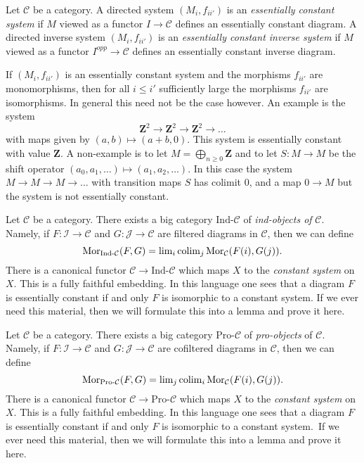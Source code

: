 \begin{definition}
\label{definition-essentially-constant-system}
Let $\mathcal{C}$ be a category. A directed system
$(M_i, f_{ii'})$ is an {\it essentially constant system}
if $M$ viewed as a functor $I \to \mathcal{C}$
defines an essentially constant diagram. A directed inverse system
$(M_i, f_{ii'})$ is an {\it essentially constant inverse system} if
$M$ viewed as a functor $I^{opp} \to \mathcal{C}$ defines an
essentially constant inverse diagram.
\end{definition}

\noindent
If $(M_i, f_{ii'})$ is an essentially constant system and the morphisms
$f_{ii'}$ are monomorphisms, then for all $i \leq i'$ sufficiently large the
morphisms $f_{ii'}$ are isomorphisms. In general this need not be the
case however. An example is the system
$$
\mathbf{Z}^2 \to \mathbf{Z}^2 \to \mathbf{Z}^2 \to \ldots
$$
with maps given by $(a, b) \mapsto (a + b, 0)$. This system is essentially
constant with value $\mathbf{Z}$. A non-example is to let
$M = \bigoplus_{n \geq 0} \mathbf{Z}$ and to let $S : M \to M$ be the
shift operator $(a_0, a_1, \ldots) \mapsto (a_1, a_2, \ldots)$. In this
case the system $M \to M \to M \to \ldots$ with transition maps $S$
has colimit $0$, and a map $0 \to M$ but the system is not essentially
constant.

\begin{remark}
\label{remark-ind-category}
Let $\mathcal{C}$ be a category. There exists a big category
$\text{Ind-}\mathcal{C}$ of {\it ind-objects of} $\mathcal{C}$.
Namely, if $F : \mathcal{I} \to \mathcal{C}$ and
$G : \mathcal{J} \to \mathcal{C}$ are filtered diagrams in $\mathcal{C}$,
then we can define
$$
\text{Mor}_{\text{Ind-}\mathcal{C}}(F, G) =
\mathop{\rm lim}\nolimits_i \mathop{\rm colim}\nolimits_j \text{Mor}_{\mathcal{C}}(F(i), G(j)).
$$
There is a canonical functor $\mathcal{C} \to \text{Ind-}\mathcal{C}$
which maps $X$ to the {\it constant system} on $X$. This is a fully
faithful embedding. In this language one sees that a diagram $F$ is
essentially constant if and only $F$ is isomorphic to a constant system.
If we ever need this material, then we will formulate this into a lemma
and prove it here.
\end{remark}

\begin{remark}
\label{remark-pro-category}
Let $\mathcal{C}$ be a category. There exists a big category
$\text{Pro-}\mathcal{C}$ of {\it pro-objects} of $\mathcal{C}$.
Namely, if $F : \mathcal{I} \to \mathcal{C}$ and
$G : \mathcal{J} \to \mathcal{C}$ are cofiltered diagrams in $\mathcal{C}$,
then we can define
$$
\text{Mor}_{\text{Pro-}\mathcal{C}}(F, G) =
\mathop{\rm lim}\nolimits_j \mathop{\rm colim}\nolimits_i \text{Mor}_{\mathcal{C}}(F(i), G(j)).
$$
There is a canonical functor $\mathcal{C} \to \text{Pro-}\mathcal{C}$
which maps $X$ to the {\it constant system} on $X$. This is a fully
faithful embedding. In this language one sees that a diagram $F$ is
essentially constant if and only $F$ is isomorphic to a constant system.\
If we ever need this material, then we will formulate this into a lemma
and prove it here.
\end{remark}

